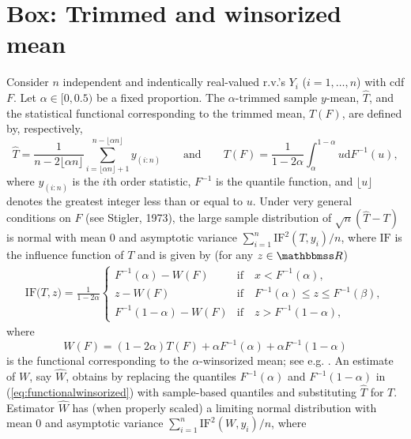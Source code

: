 \documentclass[a4paper,11pt]{scrreprt}
\begin{document}
\section{Box: Trimmed and winsorized mean}
Consider $n$ independent and indentically real-valued r.v.'s $Y_i$ ($i=1,\ldots,n$) with cdf $F$. Let $\alpha \in [0, 0.5)$ be a fixed proportion. The $\alpha$-trimmed sample $y$-mean, $\widehat{T}$, and the statistical functional corresponding to the trimmed mean, $T(F)$, are defined by, respectively, 
\begin{equation*}
   \widehat{T} = \frac{1}{n-2\lfloor \alpha n\rfloor}\sum_{i=\lfloor \alpha n\rfloor + 1}^{n - \lfloor \alpha n\rfloor}y_{(i:n)} \qquad  \text{and} \qquad  T(F) = \frac{1}{1 - 2\alpha} \int_{\alpha}^{1-\alpha} u \mathrm{d} F^{-1}(u), 
\end{equation*}
\noindent where $y_{(i:n)}$ is the $i$th order statistic, $F^{-1}$ is the quantile function, and $\lfloor u \rfloor$ denotes the greatest integer less than or equal to $u$. Under very general conditions on $F$ (see Stigler, 1973), the large sample distribution of $\sqrt{n}(\widehat{T} - T)$ is normal with mean 0 and asymptotic variance $\sum_{i=1}^n \mathrm{IF}^2(T,y_i)/n$, where $\mathrm{IF}$ is the influence function of $T$ and is given by (for any $z \in \R$) 
\begin{align*}
   \mathrm{IF}\big(T, z\big) = \frac{1}{1-2\alpha}
   \begin{cases}
      F^{-1}(\alpha) - W(F) & \text{if} \quad x < F^{-1}(\alpha),\\
      z - W(F) & \text{if} \quad F^{-1}(\alpha) \leq z \leq F^{-1}(\beta),\\
      F^{-1}(1-\alpha) - W(F) & \text{if} \quad z > F^{-1}(1-\alpha), 
   \end{cases}
\end{align*}
\noindent where
\begin{equation}\label{eq:functionalwinsorized}
   W(F) = (1 - 2\alpha )T(F) + \alpha F^{-1}(\alpha) + \alpha F^{-1}(1-\alpha)
\end{equation}
\noindent is the functional corresponding to the $\alpha$-winsorized mean; see e.g. \citet[][p. 58]{huber1981}. An estimate of $W$, say $\widehat{W}$, obtains by replacing the quantiles $F^{-1}(\alpha)$ and $F^{-1}(1-\alpha)$ in (\ref{eq:functionalwinsorized}) with sample-based quantiles and substituting $\widehat{T}$ for $T$. Estimator $\widehat{W}$ has (when properly scaled) a limiting normal distribution with mean 0 and asymptotic variance $\sum_{i=1}^n \mathrm{IF}^2(W,y_i) / n$, where \citep[see e.g.][58--59]{huber1981}
\end{document}
